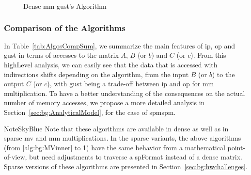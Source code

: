 \begin{figure}[htb]
    \centering
    \begin{minipage}[t]{0.49\linewidth}
        \begin{algorithm}[H]
        \caption{Dense \acrlong{mm} \acrlong{gust}'s Algorithm}
        \label{alg:bg:MMgustavson}
        \end{algorithm}
    \end{minipage}
\end{figure}

\subsubsection{Comparison of the Algorithms}

In Table~\ref{tab:AlgosCompSum}, we summarize the main features of \acrshort{ip}, \acrshort{op} and \acrshort{gust} in terms of accesses to the matrix $A$, $B$ (or $b$) and $C$ (or $c$).
From this \gls{highLevel} analysis, we can easily see that the data that is accessed with indirections shifts depending on the algorithm, from the input $B$ (or $b$) to the output $C$ (or $c$), with \acrshort{gust} being a trade-off between \acrshort{ip} and \acrshort{op} for \acrshort{mm} multiplication.
To have a better understanding of the consequences on the actual number of memory accesses, we propose a more detailed analysis in Section~\ref{sec:bg:AnalyticalModel}, for the case of \acrshort{spmspm}.

\begin{highlight}{Note}{SkyBlue}
    Note that these algorithms are available in dense as well as in sparse \acrshort{mv} and \acrshort{mm} multiplications.
    In the sparse variants, the above algorithms (from \ref{alg:bg:MVinner} to \ref{alg:bg:MMgustavson}) have the same behavior from a mathematical point-of-view, but need adjustments to traverse a \gls{spFormat} instead of a dense matrix.
    Sparse versions of these algorithms are presented in Section~\ref{sec:bg:hwchallenges}.
\end{highlight}

